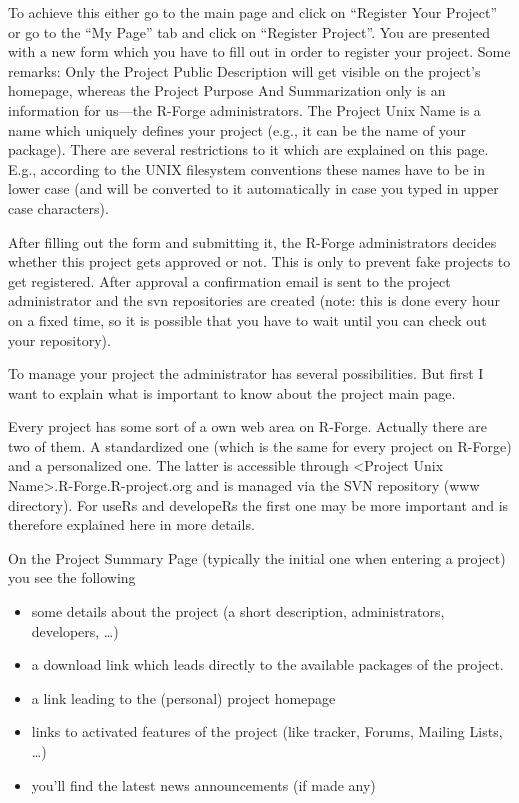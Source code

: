 To achieve this either go to the main page and click on ``Register
Your Project'' or go to the ``My Page'' tab and click on ``Register
Project''. You are presented with a new form which you have to fill
out in order to register your project. Some remarks: Only the Project
Public Description will get visible on the project's homepage, whereas
the Project Purpose And Summarization only is an information for
us---the R-Forge administrators. The Project Unix Name is a name which
uniquely defines your project (e.g., it can be the name of your
package). There are several restrictions to it which are explained on this
page. E.g., according to the UNIX
filesystem conventions these names have to be in lower case (and will
be converted to it automatically in case you typed in upper case
characters).

After filling out the form and submitting it, the R-Forge
administrators decides whether this project gets approved or not. This
is only to prevent fake projects to get registered. After approval a
confirmation email is sent to the project administrator and the svn
repositories are created (note: this is done every hour on a fixed
time, so it is possible that you have to wait until you can check out
your repository).

To manage your project the administrator has several
possibilities. But first I want to explain what is important to know
about the project main page.

Every project has some sort of a own web area on R-Forge. Actually
there are two of them. A standardized one (which is the same for every
project on R-Forge) and a personalized one. The latter is accessible
through <Project Unix Name>.R-Forge.R-project.org and is managed via
the SVN repository (www directory). For useRs and developeRs the first
one may be more important and is therefore explained here in more
details.

On the Project Summary Page (typically the initial one when entering a
project) you see the following

\begin{itemize}
\item some details about the project (a short description,
  administrators, developers, \ldots{})

\item a download link which leads directly to the available packages
  of the project.
\item a link leading to the (personal) project homepage

\item links to activated features of the project (like tracker,
  Forums, Mailing Lists, \ldots{})

\item you'll find the latest news announcements (if made any)

\end{itemize}

